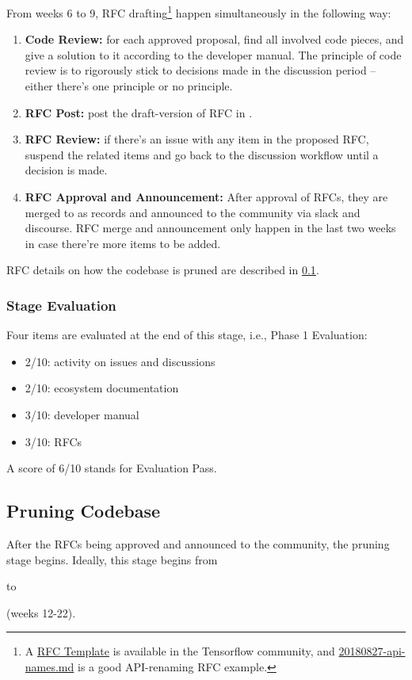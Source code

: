 From weeks 6 to 9, RFC drafting\footnote{A \href{https://github.com/tensorflow/community/blob/master/rfcs/yyyymmdd-rfc-template.md}{RFC Template} is available in the Tensorflow community, and \href{https://github.com/tensorflow/community/blob/master/rfcs/20180827-api-names.md}{20180827-api-names.md} is a good API-renaming RFC example.} happen simultaneously in the following way:
\begin{enumerate}
    \item \textbf{Code Review:} for each approved proposal, find all involved code pieces, and give a solution to it according to the developer manual. The principle of code review is to rigorously stick to decisions made in the discussion period -- either there's one principle or no principle.
    \item \textbf{RFC Post:} post the draft-version of RFC in \repogsoctempdoc{}.
    \item \textbf{RFC Review:} if there's an issue with any item in the proposed RFC, suspend the related items and go back to the discussion workflow until a decision is made.
    \item \textbf{RFC Approval and Announcement:} After approval of RFCs, they are merged to \repoimagesgithubio{} as records and announced to the community via slack and discourse. RFC merge and announcement only happen in the last two weeks in case there're more items to be added.
\end{enumerate}
RFC details on how the codebase is pruned are described in \cref{subsec:prune}.

\subsubsection*{Stage Evaluation}

Four items are evaluated at the end of this stage, i.e., \textsf{Phase 1 Evaluation}:
\begin{itemize}
    \item 2/10: activity on issues and discussions
    \item 2/10: ecosystem documentation
    \item 3/10: developer manual
    \item 3/10: RFCs
\end{itemize}
A score of 6/10 stands for \textsf{Evaluation Pass}.

\subsection{Pruning Codebase}\label{subsec:prune}
After the RFCs being approved and announced to the community, the pruning stage begins. Ideally, this stage begins from \date{July 1} to \date{August 26} (weeks 12-22).

